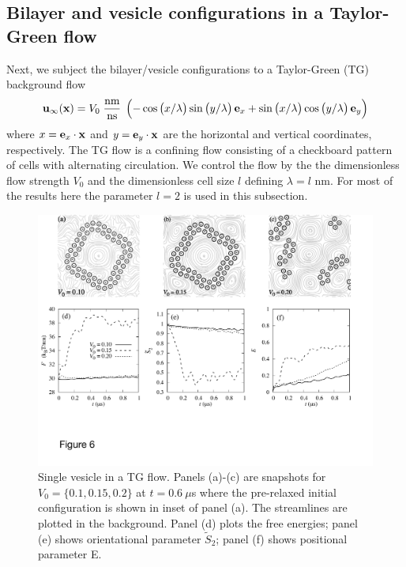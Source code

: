 \documentclass[prb,preprint,showpacs,preprintnumbers,amsmath,amssymb,longbibliography]{revtex4-1}
\newcommand{\xx}{\mathbf{x}}
\newcommand{\uu}{\mathbf{u}}
\begin{document}
\subsection{Bilayer and vesicle configurations in a Taylor-Green flow}
Next, we subject the bilayer/vesicle configurations to a 
Taylor-Green (TG) background flow
\begin{equation}
\label{eq:tg_flow}
\uu_\infty(\xx) = V_0\; \frac{\text{nm}}{\text{ns}}\;
\left(
-\cos\left(x/\lambda\right)
 \sin\left(y/\lambda\right)
         {\bf e}_x
         +\sin\left(x/\lambda\right)
         \cos\left(y/\lambda\right)
             {\bf e}_y\right)
\end{equation}
where $x = {\bf e}_x \cdot \xx$ and $y = {\bf e}_y \cdot \xx$
are the horizontal and vertical coordinates, respectively. 
The TG flow is a confining flow consisting of a checkboard pattern
of cells with alternating circulation.  We control the flow by the
the dimensionless flow strength $V_0$ and the dimensionless cell size $l$
defining $\lambda = l$ nm.
For most of the results here the parameter $l=2$ is used in this subsection.
%

\begin{figure}
  \begin{center}
    \includegraphics[width=1.0\textwidth]{Figures/Figure6.pdf}        
  \end{center}
\caption{\label{fig:ves_TG} Single vesicle in a TG flow. Panels (a)-(c) are snapshots for $V_0=\{0.1, 0.15, 0.2\}$ at $t=0.6\ \mu$s where the pre-relaxed initial configuration is shown in inset of panel (a). The streamlines are plotted in the background.
Panel (d) plots the free energies; panel (e) shows orientational parameter $\tilde{S}_2$; panel (f) shows positional parameter E.
}
\end{figure}
\end{document}
